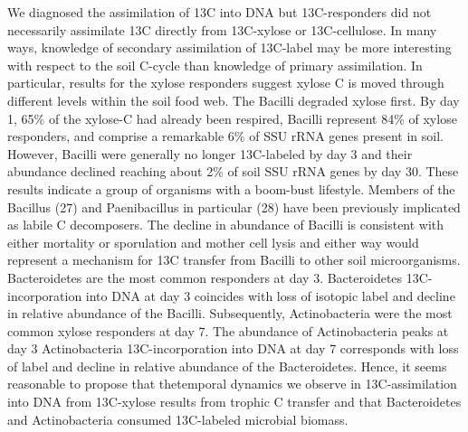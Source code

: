 We diagnosed the assimilation of 13C into DNA but 13C-responders did not
necessarily assimilate 13C directly from 13C-xylose or 13C-cellulose. In many
ways, knowledge of secondary assimilation of 13C-label may be more interesting
with respect to the soil C-cycle than knowledge of primary assimilation. In
particular, results for the xylose responders suggest xylose C is moved through
different levels within the soil food web. The Bacilli degraded xylose first.
By day 1, 65\% of the xylose-C had already been respired, Bacilli represent
84\% of xylose responders, and comprise a remarkable 6\% of SSU rRNA genes
present in soil. However, Bacilli were generally no longer 13C-labeled by day
3 and their abundance declined reaching about 2\% of soil SSU rRNA genes by day
  30. These results indicate a group of organisms with a boom-bust lifestyle.
  Members of the Bacillus (27) and Paenibacillus in particular (28) have been
  previously implicated as labile C decomposers.  The decline in abundance of
  Bacilli is consistent with either mortality or sporulation and mother cell
  lysis and either way would represent a mechanism for 13C transfer from
  Bacilli to other soil microorganisms. Bacteroidetes are the most common
  responders at day 3. Bacteroidetes 13C- incorporation into DNA at day
  3 coincides with loss of isotopic label and decline in relative abundance of
  the Bacilli. Subsequently, Actinobacteria were the most common xylose
  responders at day 7. The abundance of Actinobacteria peaks at day
3 Actinobacteria 13C-incorporation into DNA at day 7 corresponds with loss of
label and decline in relative abundance of the Bacteroidetes. Hence, it seems
reasonable to propose that thetemporal dynamics we observe in 13C-assimilation
into DNA from 13C-xylose results from trophic C transfer and that Bacteroidetes
and Actinobacteria consumed 13C-labeled microbial biomass. 


